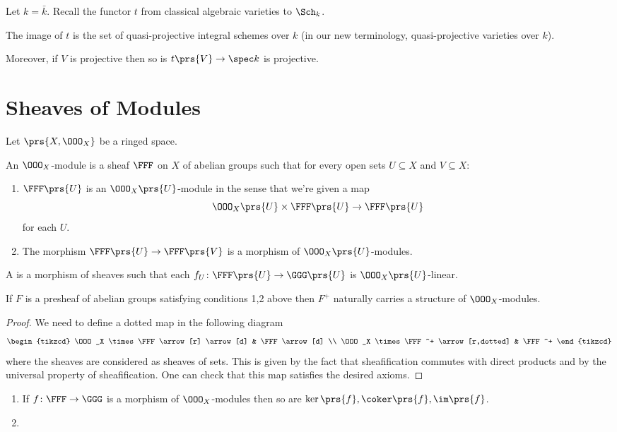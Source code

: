 \documentclass[10pt,a4paper,twoside,openany,hidelinks]{book}
\begin{document}
\begin{proposition}
Let $k = \bar{k}$. Recall the functor $t$ from classical algebraic varieties to $\Sch_k$.

The image of $t$ is the set of quasi-projective integral schemes over $k$ (in our new terminology, quasi-projective varieties over $k$).

Moreover, if $V$ is projective then so is $t\prs{V} \to \spec k$ is projective.
\end{proposition}

\chapter{Sheaves of Modules}

Let $\prs{X, \OOO_X}$ be a ringed space.

\begin{definition}
An $\OOO_X$-module is a sheaf $\FFF$ on $X$ of abelian groups such that for every open sets $U \subseteq X$ and $V \subseteq X$:
\begin{enumerate}
\item $\FFF\prs{U}$ is an $\OOO_X\prs{U}$-module in the sense that we're given a map
\[\OOO_X\prs{U} \times \FFF\prs{U} \to \FFF\prs{U}\]
for each $U$.
\item The morphism $\FFF\prs{U} \to \FFF\prs{V}$ is a morphism of $\OOO_X\prs{U}$-modules.
\end{enumerate}
\end{definition}

\begin{definition}
A  is a morphism of sheaves such that each $f_U \colon \FFF\prs{U} \to \GGG\prs{U}$ is $\OOO_X\prs{U}$-linear.
\end{definition}

\begin{lemma}
If $F$ is a presheaf of abelian groups satisfying conditions 1,2 above then $F^+$ naturally carries a structure of $\OOO_X$-modules.
\end{lemma}

\begin{proof}
We need to define a dotted map in the following diagram
\[
\begin{tikzcd}
\OOO_X \times \FFF \arrow[r] \arrow[d] & \FFF \arrow[d] \\
\OOO_X \times \FFF^+ \arrow[r,dotted] & \FFF^+
\end{tikzcd}
\]
where the sheaves are considered as sheaves of sets.
This is given by the fact that sheafification commutes with direct products and by the universal property of sheafification.
One can check that this map satisfies the desired axioms.
\end{proof}

\begin{fact}
\begin{enumerate}
\item If $f \colon \FFF \to \GGG$ is a morphism of $\OOO_X$-modules then so are $\ker\prs{f}, \coker\prs{f}, \im\prs{f}$.
\item 
\end{enumerate}
\end{fact}

\backmatter
\end{document}
